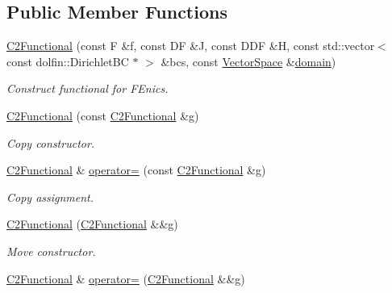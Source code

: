 \subsection*{Public Member Functions}
\begin{DoxyCompactItemize}
\item 
\hyperlink{classSpacy_1_1FEniCS_1_1C2Functional_a8f32c233a72dc3d25a656c1db12af943_a8f32c233a72dc3d25a656c1db12af943}{C2\+Functional} (const F \&f, const D\+F \&J, const D\+D\+F \&H, const std\+::vector$<$ const dolfin\+::\+Dirichlet\+B\+C $\ast$ $>$ \&bcs, const \hyperlink{classSpacy_1_1VectorSpace}{Vector\+Space} \&\hyperlink{classSpacy_1_1C2FunctionalBase_a016d11deb1525e762bdfbe7e54250718_a016d11deb1525e762bdfbe7e54250718}{domain})
\begin{DoxyCompactList}\small\item\em Construct functional for F\+Enics. \end{DoxyCompactList}\item 
\hyperlink{classSpacy_1_1FEniCS_1_1C2Functional_addb84a06f7f82969c57e5bf1b65f2b68_addb84a06f7f82969c57e5bf1b65f2b68}{C2\+Functional} (const \hyperlink{classSpacy_1_1FEniCS_1_1C2Functional}{C2\+Functional} \&g)
\begin{DoxyCompactList}\small\item\em Copy constructor. \end{DoxyCompactList}\item 
\hyperlink{classSpacy_1_1FEniCS_1_1C2Functional}{C2\+Functional} \& \hyperlink{classSpacy_1_1FEniCS_1_1C2Functional_ab9ff23de1e812f6782b7db6ec01e0f4c_ab9ff23de1e812f6782b7db6ec01e0f4c}{operator=} (const \hyperlink{classSpacy_1_1FEniCS_1_1C2Functional}{C2\+Functional} \&g)
\begin{DoxyCompactList}\small\item\em Copy assignment. \end{DoxyCompactList}\item 
\hyperlink{classSpacy_1_1FEniCS_1_1C2Functional_af9ac63335fc062d18e08fa186312b5a2_af9ac63335fc062d18e08fa186312b5a2}{C2\+Functional} (\hyperlink{classSpacy_1_1FEniCS_1_1C2Functional}{C2\+Functional} \&\&g)
\begin{DoxyCompactList}\small\item\em Move constructor. \end{DoxyCompactList}\item 
\hyperlink{classSpacy_1_1FEniCS_1_1C2Functional}{C2\+Functional} \& \hyperlink{classSpacy_1_1FEniCS_1_1C2Functional_a96a909732f7f098d67ee5eba20406337_a96a909732f7f098d67ee5eba20406337}{operator=} (\hyperlink{classSpacy_1_1FEniCS_1_1C2Functional}{C2\+Functional} \&\&g)

\end{DoxyCompactItemize}
